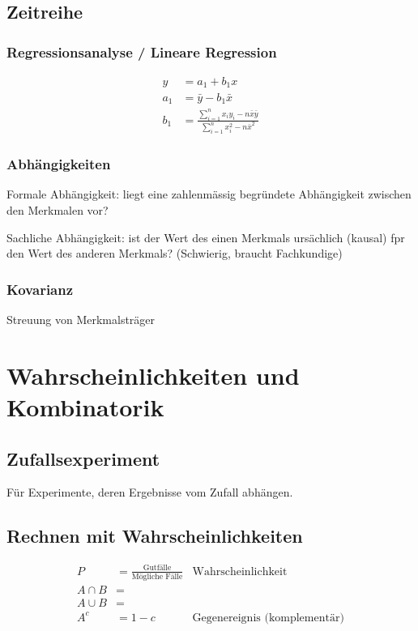 \subsection{Zeitreihe}

\subsubsection{Regressionsanalyse / Lineare Regression}

\begin{align*}
y &= a_1 + b_1 x\\
a_1 &= \bar{y} - b_1 \bar{x} \\
b_1 &= \frac{\sum^{n}_{i=1}{x_iy_i-n\bar{x}\bar{y}}}{\sum^n_{i=1}{x^2_i - n\bar{x}^2}}
\end{align*}

\subsubsection{Abhängigkeiten}
Formale Abhängigkeit: liegt eine zahlenmässig begründete Abhängigkeit zwischen den Merkmalen vor?

Sachliche Abhängigkeit: ist der Wert des einen Merkmals ursächlich (kausal) fpr den Wert des anderen Merkmals? (Schwierig, braucht Fachkundige)

\subsubsection{Kovarianz}
Streuung von Merkmalsträger

\section{Wahrscheinlichkeiten und Kombinatorik}

\subsection{Zufallsexperiment}

Für Experimente, deren Ergebnisse vom Zufall abhängen.

\subsection{Rechnen mit Wahrscheinlichkeiten}

\begin{align*}
P &=  \frac{\text{Gutfälle}}{\text{Mögliche Fälle}} & \text{Wahrscheinlichkeit}\\
A \cap B &= \\
A \cup B &= \\
A^c &= 1 - c & \text{Gegenereignis (komplementär)}
\end{align*}

